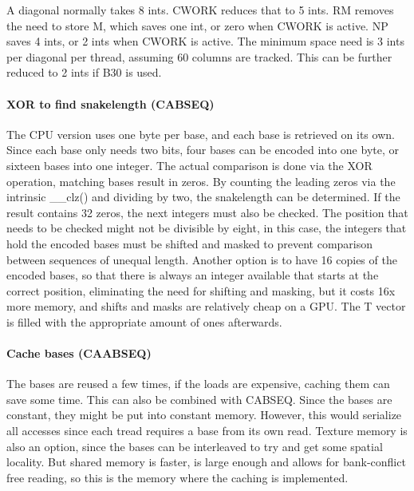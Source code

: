 \documentclass[../thesis.tex]{subfiles}
\begin{document}
A diagonal normally takes 8 ints.
CWORK reduces that to 5 ints.
RM removes the need to store M, which saves one int, or zero when CWORK is active.
NP saves 4 ints, or 2 ints when CWORK is active.
The minimum space need is 3 ints per diagonal per thread, assuming 60 columns are tracked.
This can be further reduced to 2 ints if B30 is used.


\paragraph{XOR to find snakelength (CABSEQ)}
The CPU version uses one byte per base, and each base is retrieved on its own.
Since each base only needs two bits, four bases can be encoded into one byte, or sixteen bases into one integer.
The actual comparison is done via the XOR operation, matching bases result in zeros.
By counting the leading zeros via the intrinsic \_\_clz() \cite{CUDA_math} and dividing by two, the snakelength can be determined.
If the result contains 32 zeros, the next integers must also be checked.
The position that needs to be checked might not be divisible by eight, in this case, the integers that hold the encoded bases must be shifted and masked to prevent comparison between sequences of unequal length.
Another option is to have 16 copies of the encoded bases, so that there is always an integer available that starts at the correct position, eliminating the need for shifting and masking, but it costs 16x more memory, and shifts and masks are relatively cheap on a GPU.
The T vector is filled with the appropriate amount of ones afterwards.

\paragraph{Cache bases (CAABSEQ)}
The bases are reused a few times, if the loads are expensive, caching them can save some time.
This can also be combined with CABSEQ.
Since the bases are constant, they might be put into constant memory.
However, this would serialize all accesses since each tread requires a base from its own read.
Texture memory is also an option, since the bases can be interleaved to try and get some spatial locality.
But shared memory is faster, is large enough and allows for bank-conflict free reading, so this is the memory where the caching is implemented.
\end{document}

